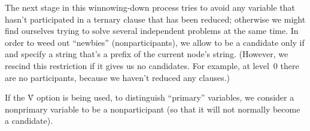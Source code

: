 The next stage in this winnowing-down process tries to
avoid any variable
that hasn't participated in a ternary clause that has been reduced;
otherwise we might find ourselves trying to solve several independent
problems at the same time. In order to weed out ``newbies'' (nonparticipants),
we allow  to be a candidate only if  and %
specify a string that's a prefix of the current node's string.
(However, we rescind this restriction if it gives us no candidates. For
example, at level~0 there are no participants, because we haven't reduced any
clauses.)

If the \.V option is being used, to distinguish ``primary'' variables,
we consider a nonprimary variable to be a nonparticipant (so that it
will not normally become a candidate).

